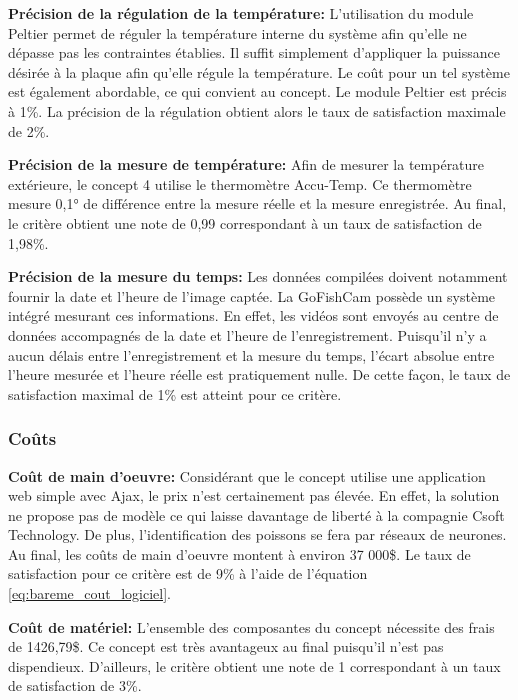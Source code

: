\textbf{Précision de la régulation de la température:} L'utilisation du module Peltier permet de réguler la température interne du système afin qu'elle ne dépasse pas les contraintes établies. Il suffit simplement d'appliquer la puissance désirée à la plaque afin qu'elle régule la température. Le coût pour un tel système est également abordable, ce qui convient au concept. Le module Peltier est précis à 1\%. La précision de la régulation obtient alors le taux de satisfaction maximale de 2\%.
\vspace{5mm}

\textbf{Précision de la mesure de température:} Afin de mesurer la température extérieure, le concept 4 utilise le thermomètre Accu-Temp. Ce thermomètre mesure 0,1° de différence entre la mesure réelle et la mesure enregistrée. Au final, le critère obtient une note de 0,99 correspondant à un taux de satisfaction de 1,98\%.
\vspace{5mm}

\textbf{Précision de la mesure du temps:} Les données compilées doivent notamment fournir la date et l'heure de l'image captée. La GoFishCam possède un système intégré mesurant ces informations. En effet, les vidéos sont envoyés au centre de données accompagnés de la date et l'heure de l'enregistrement. Puisqu'il n'y a aucun délais entre l'enregistrement et la mesure du temps, l'écart absolue entre l'heure mesurée et l'heure réelle est pratiquement nulle. De cette façon, le taux de satisfaction maximal de 1\% est atteint pour ce critère. 


\subsubsection{Coûts}

\textbf{Coût de main d'oeuvre:} Considérant que le concept utilise une application web simple avec Ajax, le prix n'est certainement pas élevée. En effet, la solution ne propose pas de modèle ce qui laisse davantage de liberté à la compagnie Csoft Technology. De plus, l'identification des poissons se fera par réseaux de neurones. Au final, les coûts de main d'oeuvre montent à environ 37 000\$. Le taux de satisfaction pour ce critère est de 9\% à l'aide de l'équation \ref{eq:bareme_cout_logiciel}.
\vspace{5mm}

\textbf{Coût de matériel:} L'ensemble des composantes du concept nécessite des frais de 1426,79\$. Ce concept est très avantageux au final puisqu'il n'est pas dispendieux. D'ailleurs, le critère obtient une note de 1 correspondant à un taux de satisfaction de 3\%.
\vspace{5mm}

